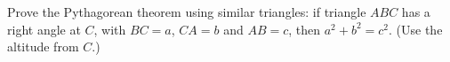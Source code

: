 Prove the Pythagorean theorem using similar triangles: if triangle $ABC$ has a right angle at $C$, with $BC=a$, $CA=b$ and $AB=c$, then $a^2+b^2=c^2$. (Use the altitude from $C$.)
